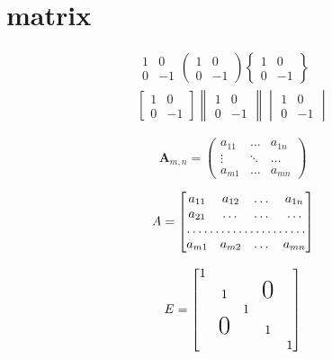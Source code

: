 \documentclass{book}
\begin{document}
\section{matrix}
\begin{gather}
	\begin{matrix}
	1 & 0 \\ 
	0 & -1 
	\end{matrix}	
	\begin{pmatrix}
	1 & 0 \\
	 0 & -1 
	\end{pmatrix}	
	\begin{Bmatrix}
	1 & 0 \\
	0 & -1
	\end{Bmatrix}\\	
	\begin{bmatrix}
	1 & 0 \\
	0 & -1 
	\end{bmatrix}	
	\begin{Vmatrix}
	1 & 0 \\
	0 & -1 
	\end{Vmatrix}			
	\begin{vmatrix}
	1 & 0 \\
	0 & -1
	 \end{vmatrix}	
\end{gather}

\begin{equation}
	\mathbf{A}_{m,n} = 
	\begin{pmatrix}
	a_{11} & \dots & a_{1n} \\
	\vdots & \ddots & \dots \\
	a_{m1} & \dots & a_{mn} 
	\end{pmatrix}
\end{equation}

\begin{equation}
	A = 
	\begin{bmatrix}
	a_{11} & a_{12} & \dots & a_{1n}\\
	a_{21} & \dots & \dots & \dots\\
	\hdotsfor{4}\\
	a_{m1} & a_{m2} & \dots & a_{mn} 
	\end{bmatrix}
\end{equation}

\begin{equation}
	E=
	\begin{bmatrix}
	1\\
	& 1 &  & \text{{\huge 0}}\\
	& & 1 \\
	& \text{{\huge 0}} & & 1\\
	& & & & 1
	\end{bmatrix}
\end{equation}
\end{document}
